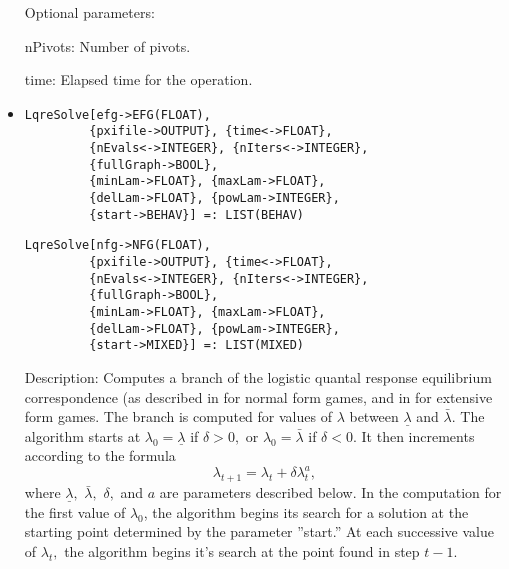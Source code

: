 \begin{itemize}
\item
[Optional parameters:]\hfil\null

\bd
\item[nPivots:] Number of pivots. 
\item[time:] Elapsed time for the operation.
\ed
\ed

\item
\protect \large \begin{verbatim}
LqreSolve[efg->EFG(FLOAT),
         {pxifile->OUTPUT}, {time<->FLOAT},
         {nEvals<->INTEGER}, {nIters<->INTEGER},
         {fullGraph->BOOL},
         {minLam->FLOAT}, {maxLam->FLOAT}, 
         {delLam->FLOAT}, {powLam->INTEGER}, 
         {start->BEHAV}] =: LIST(BEHAV)
\end{verbatim}\normalsize

\protect \large \begin{verbatim}
LqreSolve[nfg->NFG(FLOAT),
         {pxifile->OUTPUT}, {time<->FLOAT},
         {nEvals<->INTEGER}, {nIters<->INTEGER},
         {fullGraph->BOOL},
         {minLam->FLOAT}, {maxLam->FLOAT}, 
         {delLam->FLOAT}, {powLam->INTEGER}, 
         {start->MIXED}] =: LIST(MIXED)
\end{verbatim}\normalsize

\bd
\item
[Description:] Computes a branch of the logistic quantal response
equilibrium correspondence (as described in \cite[1995]{McKPal:95a}
for normal form games, and in \cite[1995b]{McKPal:95b} for extensive
form games.  The branch is computed for values of $\lambda$ between
$\underline{\lambda}$ and $\bar{\lambda}.$ The algorithm starts at
$\lambda_0 = \underline{\lambda}$ if $\delta>0,$ or $\lambda_0 =
\bar{\lambda}$ if $\delta<0$. It then increments according to the
formula 
$$
\lambda_{t+1} = \lambda_t +\delta \lambda_t^a,
$$ where $\underline\lambda,$ $\bar\lambda,$ $\delta,$ and $a$ are
parameters described below. In the computation for the first value of
$\lambda_0$, the algorithm begins its search for a solution at the
starting point determined by the parameter ''start.''  At each
successive value of $\lambda_t,$ the algorithm begins it's search at
the point found in step $t - 1.$ 


\end{itemize}
